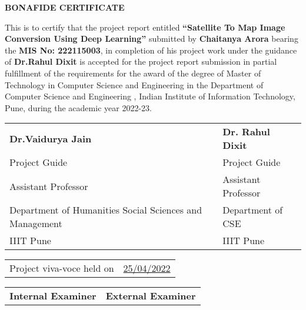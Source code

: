 \thispagestyle{plain}
\begin{center}
\fontsize{16pt}{14pt}\selectfont\textbf{BONAFIDE CERTIFICATE}
\end{center}

\vspace{0.3cm}
\fontsize{12pt}{24pt}\selectfont This is to certify  that the project report entitled   \textbf{“Satellite To Map Image Conversion Using Deep Learning”}  submitted by  \textbf{Chaitanya Arora} bearing the  \textbf{MIS No: 222115003},  in completion of his project work under the guidance of  \textbf{Dr.Rahul Dixit} is accepted for the project report submission in partial fulfillment of the requirements for the award of the degree of Master of Technology in Computer Science and Engineering in the Department of Computer Science and Engineering , Indian Institute of Information Technology, Pune, during the academic year 2022-23.


\vspace{2.5cm}




\fontsize{12pt}{20pt}\selectfont 
\noindent
\begin{tabu}{X[l] l}
 \textbf{Dr.Vaidurya Jain}\textbf{} & \textbf{Dr. Rahul Dixit} \\
 Project Guide & Project Guide\\
 Assistant Professor & Assistant Professor \\
 Department of Humanities Social Sciences and Management & Department of CSE\\
 IIIT Pune & IIIT Pune\\
\end{tabu}

\vspace{2.0cm}
\noindent
\begin{tabular}{lc}
\fontsize{12pt}{24pt}\selectfont Project viva-voce held on & \underline{25/04/2022}

\end{tabular}

\vspace{3.5cm}
\fontsize{12pt}{18pt}\selectfont 
\noindent
\begin{tabu} to \textwidth { X[l] X[c] }

 \textbf{Internal Examiner} & \textbf{External Examiner}

\end{tabu}

\newpage